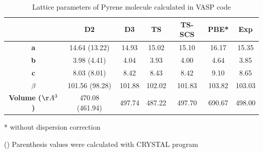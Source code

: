 	\begin{table}[H]
 		\caption{Lattice parameters of Pyrene molecule calculated in VASP code}  \label{table-pyresol}
 		\begin{center}
 			\begin{threeparttable}
 			\begin{tabular}{c c c c c c c}
 				\toprule
 				& \textbf{D2} & \textbf{D3} & \textbf{TS} & \textbf{TS-SCS} & \textbf{PBE*} & \textbf{Exp} \\
 				\midrule
 				\textbf{a} & 14.64 (13.22) & 14.93 & 15.02 & 15.10 & 16.17 & 15.35\\
 				\textbf{b}& 3.98 (4.41) & 4.04 & 3.93 & 4.00 & 4.64 & 3.85\\
 				\textbf{c}& 8.03 (8.01) & 8.42 & 8.43 & 8.42 & 9.10 & 8.65\\
 				\textbf{$\beta$} & 101.56 (98.28) & 101.88 & 102.02 & 101.83 & 103.82 & 103.03\\
 				\textbf{Volume ($\AA^{3}$)}& 470.08 (461.94) & 497.74 & 487.22 & 497.70 & 690.67 & 498.00\\
 				\bottomrule
 			\end{tabular}
 			
 			\begin{tablenotes}
 				\item[*] without dispersion correction
 				\item[()] Parenthesis values were calculated with CRYSTAL program
 			\end{tablenotes}
 		\end{threeparttable}
 		\end{center}
 	\end{table}
 	

